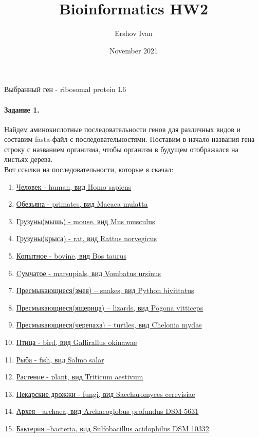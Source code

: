 \documentclass[12pt]{article}
\title{Bioinformatics HW2}
\author{Ershov Ivan}
\date{November 2021}
\begin{document}
\maketitle
Выбранный ген - ribosomal protein L6

\paragraph{Задание 1.}
Найдем аминокислотные последовательности генов для различных видов и составим fasta-файл с последовательностями. Поставим в начало названия гена строку с названием организма, чтобы организм в будущем отображался на листьях дерева.\\
Вот ссылки на последовательности, которые я скачал:
\begin{enumerate}
    \itemsep0em
    \item \href{https://www.ncbi.nlm.nih.gov/protein/CAA49188.1?report=fasta}{Человек - human, вид Homo sapiens} 
    \item \href{https://www.ncbi.nlm.nih.gov/protein/NP_001180484.1?report=fasta}{Обезьяна - primates, вид Macaca mulatta} 
    \item \href{https://www.ncbi.nlm.nih.gov/protein/NP_035420.2?report=fasta}{Грузуны(мышь) - mouse, вид Mus musculus} 
    \item \href{https://www.ncbi.nlm.nih.gov/protein/CAA60588.1?report=fasta}{Грузуны(крыса) - rat, вид Rattus norvegicus} 
    \item \href{https://www.ncbi.nlm.nih.gov/protein/AAI33431.1?report=fasta}{Копытное -   bovine, вид Bos taurus} 
    \item \href{https://www.ncbi.nlm.nih.gov/protein/XP_027720672.1?report=fasta}{Cумчатое - marsupials, вид Vombatus ursinus} 
    \item \href{https://www.ncbi.nlm.nih.gov/protein/XP_007433584.1?report=fasta}{Пресмыкающиеся(змея) – snakes, вид Python bivittatus} 
    \item \href{https://www.ncbi.nlm.nih.gov/protein/XP_020657572.1?report=fasta}{Пресмыкающиеся(ящерица) – lizards, вид Pogona vitticeps} 
    \item \href{https://www.ncbi.nlm.nih.gov/protein/EMP37138.1?report=fasta}{Пресмыкающиеся(черепаха) – turtles, вид Chelonia mydas} 
    \item \href{https://www.ncbi.nlm.nih.gov/protein/LAC33108.1?report=fasta}{Птица - bird, вид Gallirallus okinawae} 
    \item \href{https://www.ncbi.nlm.nih.gov/protein/NP_001158741.1?report=fasta}{Рыба - fish, вид Salmo salar} 
    \item \href{https://www.ncbi.nlm.nih.gov/protein/AAW50981.1?report=fasta}{Растение - plant, вид Triticum aestivum} 
    \item \href{https://www.ncbi.nlm.nih.gov/protein/CAA49236.1?report=fasta}{Пекарские дрожжи  - fungi, вид Saccharomyces cerevisiae} 
    \item \href{https://www.ncbi.nlm.nih.gov/protein/ADB58394.1?report=fasta}{Архея - archaea, вид Archaeoglobus profundus DSM 5631} 
    \item \href{https://www.ncbi.nlm.nih.gov/protein/AEW03871.1?report=fasta}{Бактерия –bacteria, вид Sulfobacillus acidophilus DSM 10332} 
\end{enumerate}
\newpage
\end{document}
